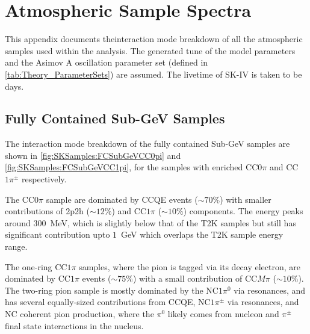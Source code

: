 \chapter{Atmospheric Sample Spectra}
\label{chap:AppendixA}

This appendix documents theinteraction mode breakdown of all the atmospheric samples used within the analysis. The generated tune of the model parameters and the Asimov A oscillation parameter set (defined in \autoref{tab:Theory_ParameterSets}) are assumed. The livetime of SK-IV is taken to be  days.

\section{Fully Contained Sub-GeV Samples}
The interaction mode breakdown of the fully contained Sub-GeV samples are shown in \autoref{fig:SKSamples:FCSubGeVCC0pi} and \autoref{fig:SKSamples:FCSubGeVCC1pi}, for the samples with enriched CC$0\pi$ and CC$1\pi^\pm$ respectively.

The CC$0\pi$ sample are dominated by CCQE events ($\sim 70\%$) with smaller contributions of 2p2h ($\sim 12\%$) and CC$1\pi$ ($\sim 10\%$) components. The energy peaks around $300$~MeV, which is slightly below that of the T2K samples but still has significant contribution upto $1$~GeV which overlaps the T2K sample energy range.

The one-ring CC$1\pi$ samples, where the pion is tagged via its decay electron, are dominated by CC$1\pi$ events ($\sim 75\%$) with a small contribution of CC$M\pi$ ($\sim 10\%$). The two-ring pion sample is mostly dominated by the NC$1\pi^0$ via resonances, and has several equally-sized contributions from CCQE, NC$1\pi^\pm$ via resonances, and NC coherent pion production, where the $\pi^0$ likely comes from nucleon and $\pi^\pm$ final state interactions in the nucleus.

